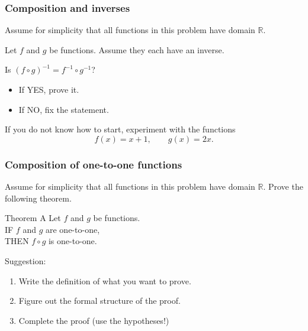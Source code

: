 \begin{frame}[t]
	\frametitle{Composition and inverses}

	Assume for simplicity that all functions in this problem have domain
	$\mathbb{R}$.

	\vfill

	Let $f$ and $g$ be functions. Assume they each have an inverse.

	\vfill

	Is $\displaystyle \left( f \circ g \right)^{-1}= f^{-1}\circ g^{-1}$?

	\begin{itemize}
		\item If YES, prove it.

		\item If NO, fix the statement.
	\end{itemize}

	\vfill

	If you do not know how to start, experiment with the functions
	\[
		f(x) = x + 1, \quad \quad g(x) = 2x.
	\]
\end{frame}

\begin{frame}[t]
	\frametitle{Composition of one-to-one functions}

	Assume for simplicity that all functions in this problem have domain
	$\mathbb{R}$. Prove the following theorem.

	\vfill

	\begin{block}{Theorem A}
		Let $f$ and $g$ be functions. \\ IF $f$ and $g$ are one-to-one, \\ THEN $f \circ
		g$ is one-to-one.
	\end{block}

	\vfill

	Suggestion:
	\begin{enumerate}
		\item Write the definition of what you want to prove.

		\item Figure out the formal structure of the proof.

		\item Complete the proof (use the hypotheses!)
	\end{enumerate}
\end{frame}

